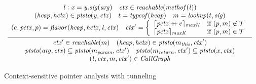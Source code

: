 
\begin{figure}[t]
  \[
    \begin{array}{c}
      \infer[]
      {
      \begin{array}{c}
        \ctx' \in \Reachable ({m}) \quad
        ({\heap}, {\hctx}) \in  \VarPointsTo ({m_{\this}}, {\ctx'}) \\
        \VarPointsTo({\it arg}, \ctx) \subseteq \VarPointsTo(m_{\it param}, \ctx')
        \quad
        \VarPointsTo(m_{\it return}, \ctx') \subseteq \VarPointsTo(x, \ctx)\\
        (\invo, \ctx, m, \ctx') \in \CallGraph
      \end{array}
      }{
      \begin{array}{c}
        {\it \invo : x = y.\sig({\it arg})} \quad
        \ctx \in    \Reachable ({\methof(\invo)}) \\
        ({\heap}, {\hctx})\in  \VarPointsTo ({\it y},\ctx) \quad
        t = {\typeof}(\heap)  \quad m = {\lookup}(t, \sig) \\
(e, {\pctx}, p) = \parent(\heap,\hctx, \invo, \ctx) \quad
        \ctx' = \left\{
        \begin{array}{l@{\quad}l}
          \truncateCtx{\appendCtx{{ \pctx}}{{e}}}{\CallDepth}
          & \mbox{if}~(p,m)\not\in \TunnelingRelation \\
          \truncateCtx{\pctx}{\CallDepth}     & \mbox{if}~(p,m)
                                                \in \TunnelingRelation
        \end{array}
                                                          \right.
      \end{array}
                                                          }
    \end{array}
  \]
  \caption{Context-sensitive pointer analysis with tunneling}
\label{fig:tunneling-rules}
\end{figure}


